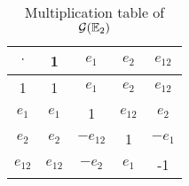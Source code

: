 \begin{table}[h!]
	\centering
	\begin{tabular}{|c|c|c|c|c|}
		\hline
		$\cdot$ & 1 & $e_1$ & $e_2$ & $e_{12}$ \\
		\hline
		1 & 1 & $e_1$ & $e_2$ & $e_{12}$ \\
		\hline
		$e_1$ & $e_1$ & 1 & $e_{12}$ & $e_2$ \\
		\hline
		$e_2$ & $e_2$ & $-e_{12}$ & 1 & $-e_1$ \\
		\hline
		$e_{12}$ & $e_{12}$ & $-e_2$ & $e_1$ & -1 \\
		\hline
	\end{tabular}
	\caption{Multiplication table of $\mathcal{G}(\mathbb{E}_2)$}
	\label{ta:mt2a}
\end{table}
